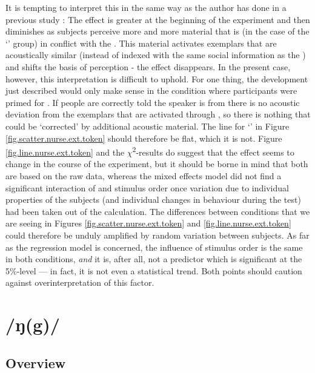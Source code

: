 It is tempting to interpret this in the same way as the author has done in a previous study \parencite[cf.][]{juskanma}: The  effect is greater at the beginning of the experiment and then diminishes as subjects perceive more and more material that is (in the case of the `' group) in conflict with the .
This material activates exemplars that are acoustically similar (instead of indexed with the same social information as the ) and shifts the basis of perception - the  effect disappears.
In the present case, however, this interpretation is difficult to uphold.
For one thing, the development just described would only make sense in the condition where participants were primed for .
If people are correctly told the speaker is from  there is no acoustic deviation from the exemplars that are activated through , so there is nothing that could be `corrected' by additional acoustic material.
The line for `' in Figure \ref{fig.scatter.nurse.ext.token} should therefore be flat, which it is not.
Figure \ref{fig.line.nurse.ext.token} and the \(\chi\)\textsuperscript{2}-results do suggest that the  effect seems to change in the course of the experiment, but it should be borne in mind that both are based on the raw data, whereas the mixed effects model did not find a significant interaction of  and stimulus order once variation due to individual properties of the subjects (and individual changes in behaviour during the test) had been taken out of the calculation.
The differences between conditions that we are seeing in Figures \ref{fig.scatter.nurse.ext.token} and \ref{fig.line.nurse.ext.token} could therefore be unduly amplified by random variation between subjects.
As far as the regression model is concerned, the influence of stimulus order is the same in both conditions, \emph{and} it is, after all, not a predictor which is significant at the 5\%-level --- in fact, it is not even a statistical trend.
Both points should caution against overinterpretation of this factor.


\section{/ŋ(g)/}
\label{sec.perc_res.ng}
	\subsection{Overview}
	\label{sec.perc_res.ng.overview}

